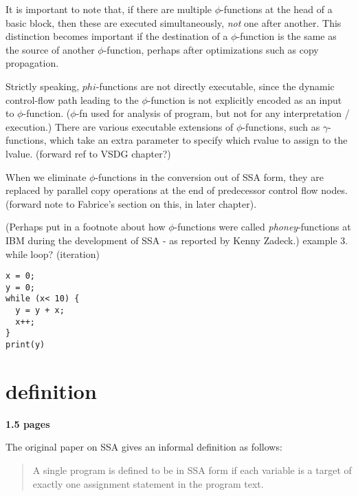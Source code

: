 It is important to note that, if there are multiple $\phi$-functions
at the head of a basic block, then these are executed simultaneously,
\textit{not} one after another.
This distinction becomes important if the destination of a $\phi$-function
is the same as the source of another $\phi$-function, perhaps after
optimizations such as copy propagation.

Strictly speaking, $phi$-functions are not directly executable,
since the dynamic control-flow path leading to the $\phi$-function
is not explicitly encoded as an input to $\phi$-function.
($\phi$-fn used for analysis of program, but not for any
interpretation / execution.)
There are various executable extensions of $\phi$-functions, 
such as $\gamma$-functions, which take
an extra parameter to specify which rvalue to assign to the lvalue.
(forward ref to VSDG chapter?)

When we eliminate $\phi$-functions in the conversion out of SSA form,
they are replaced by parallel copy operations at the end of predecessor
control flow nodes. (forward note to Fabrice's section on this,
in later chapter).

(Perhaps put in a footnote about how $\phi$-functions were
called \textit{phoney}-functions at IBM during the development
of SSA - as reported by Kenny Zadeck.)
example 3. while loop? (iteration)

\begin{verbatim}
x = 0;
y = 0;
while (x< 10) {
  y = y + x;
  x++;
}
print(y)
\end{verbatim}




\section{definition}

\textbf{1.5 pages}

The original paper on SSA gives an informal
definition as follows:

\begin{quotation}
A single program is defined to be in SSA
form if each variable is a target of
exactly one assignment statement in the
program text.
\end{quotation}



